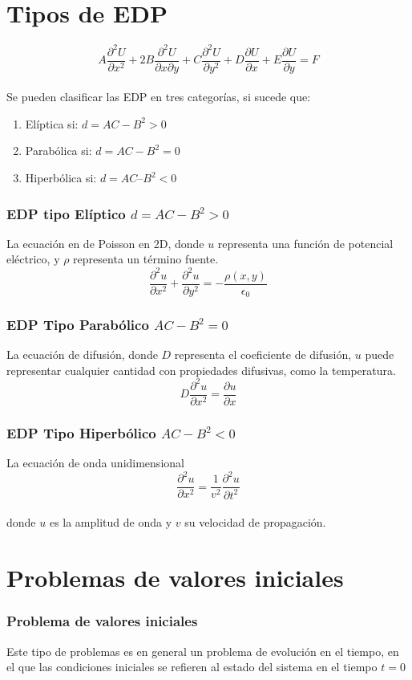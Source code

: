 \section{Tipos de EDP}
\begin{frame}
\[ A \dfrac{\partial^{2} U}{\partial x^{2}} + 2B \dfrac{\partial^{2} U}{\partial x \partial y} + C \dfrac{\partial^{2} U}{\partial y^{2}} + D \dfrac{\partial U}{\partial x} + E \dfrac{\partial U}{\partial y} = F \]
\\
\medskip
Se pueden clasificar las EDP en tres categorías, si sucede que:
\begin{enumerate}
\item Elíptica si: $d = AC - B^{2} > 0$
\item Parabólica si: $d = AC - B^{2} = 0$
\item Hiperbólica si: $d = AC – B^{2}  < 0$  
\end{enumerate}
\end{frame}
\begin{frame}
\frametitle{EDP tipo Elíptico $d = AC - B^{2} > 0$}
La ecuación en de Poisson en 2D, donde $u$ representa una función de potencial eléctrico, y $\rho$ representa un término fuente.
\[ \dfrac{\partial^{2} u}{\partial x^{2}} + \dfrac{\partial^{2} u}{\partial y^{2}} = - \dfrac{\rho(x,y)}{\epsilon_{0}} \]
\end{frame}
\begin{frame}
\frametitle{EDP Tipo Parabólico $AC-B^{2}=0$}
La ecuación de difusión, donde $D$ representa el coeficiente de difusión,  $u$ puede representar cualquier cantidad con propiedades difusivas, como la temperatura.
\[ D \dfrac{\partial^{2} u}{\partial x^{2}} = \dfrac{\partial u}{\partial x} \]
\end{frame}
\begin{frame}
\frametitle{EDP Tipo Hiperbólico $AC-B^{2}<0$}
La ecuación de onda unidimensional
\[ \dfrac{\partial^{2} u}{\partial x^{2}} = \dfrac{1}{v^{2}} \dfrac{\partial^{2} u}{\partial t^{2}} \]
\\
\medskip
donde $u$ es la amplitud de onda y $v$ su velocidad de propagación.
\end{frame}
\section{Problemas de valores iniciales}
\begin{frame}
\frametitle{Problema de valores iniciales}
Este tipo de problemas es en general un problema de evolución en el tiempo, en el que las condiciones iniciales se refieren al estado del sistema en el tiempo $t=0$
\end{frame}
